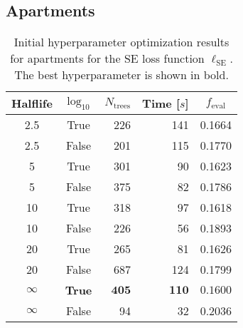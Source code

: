 


\subsection*{Apartments}

 \begin{table}[h!]
  \centerfloat
  \begin{tabular}{@{}ccrrc@{}}
    Halflife & $\log_{10}$ & $N_\mathrm{trees}$ & Time [$s$] & $f_\mathrm{eval}$ \\
    \midrule
    \num{2.5} & True & \num{226} & \num{141} & \num{0.1664} \\
    \num{2.5} & False & \num{201} & \num{115} & \num{0.1770} \\
    \num{5} & True & \num{301} & \num{90} & \num{0.1623} \\
    \num{5} & False & \num{375} & \num{82} & \num{0.1786} \\
    \num{10} & True & \num{318} & \num{97} & \num{0.1618} \\
    \num{10} & False & \num{226} & \num{56} & \num{0.1893} \\
    \num{20} & True & \num{265} & \num{81} & \num{0.1626} \\
    \num{20} & False & \num{687} & \num{124} & \num{0.1799} \\
    $\bm{\infty}$ & \textbf{True} & $\mathbf{405}$ & $\mathbf{110}$ & $\mathbf{0.1600}$ \\
    $\infty$ & False & \num{94} & \num{32} & \num{0.2036} \\
  \end{tabular}
  \caption[Initial Hyperparameter Optimization Results for Apartments -- SE Loss Function]{\label{tab:h:HPO_initial_Rmse-ejerlejlighed-appendix}Initial hyperparameter optimization results for apartments for the SE loss function $\ell_\mathrm{SE}$. The best hyperparameter is shown in bold.}
\end{table}


